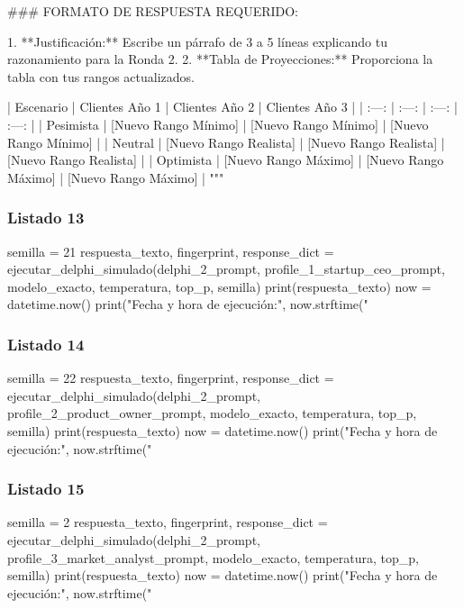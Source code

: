 \begin{APACode}
### FORMATO DE RESPUESTA REQUERIDO:

1.  **Justificación:** Escribe un párrafo de 3 a 5 líneas explicando tu razonamiento para la Ronda 2.
2.  **Tabla de Proyecciones:** Proporciona la tabla con tus rangos actualizados.

| Escenario | Clientes Año 1 | Clientes Año 2 | Clientes Año 3 |
| :---: | :---: | :---: | :---: |
| Pesimista | [Nuevo Rango Mínimo] | [Nuevo Rango Mínimo] | [Nuevo Rango Mínimo] |
| Neutral | [Nuevo Rango Realista] | [Nuevo Rango Realista] | [Nuevo Rango Realista] |
| Optimista | [Nuevo Rango Máximo] | [Nuevo Rango Máximo] | [Nuevo Rango Máximo] |
"""
\end{APACode}

\subsubsection{Listado 13}
\label{anexo:code-6-3-1-1-13}

\begin{APACode}
semilla = 21
respuesta_texto, fingerprint, response_dict = ejecutar_delphi_simulado(delphi_2_prompt, profile_1_startup_ceo_prompt, modelo_exacto, temperatura, top_p, semilla)
print(respuesta_texto)
now = datetime.now()
print("Fecha y hora de ejecución:", now.strftime("%
\end{APACode}

\subsubsection{Listado 14}
\label{anexo:code-6-3-1-1-14}

\begin{APACode}
semilla = 22
respuesta_texto, fingerprint, response_dict = ejecutar_delphi_simulado(delphi_2_prompt, profile_2_product_owner_prompt, modelo_exacto, temperatura, top_p, semilla)
print(respuesta_texto)
now = datetime.now()
print("Fecha y hora de ejecución:", now.strftime("%
\end{APACode}

\subsubsection{Listado 15}
\label{anexo:code-6-3-1-1-15}

\begin{APACode}
semilla = 2
respuesta_texto, fingerprint, response_dict = ejecutar_delphi_simulado(delphi_2_prompt, profile_3_market_analyst_prompt, modelo_exacto, temperatura, top_p, semilla)
print(respuesta_texto)
now = datetime.now()
print("Fecha y hora de ejecución:", now.strftime("%
\end{APACode}

